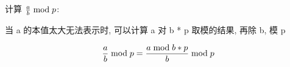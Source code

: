 计算 ${a \over b} \bmod p$:

当 a 的本值太大无法表示时, 可以计算 a 对 b * p 取模的结果, 再除 b, 模 p

$$ {a \over b} \bmod p = {{ a \bmod {b * p} } \over b } \bmod p $$